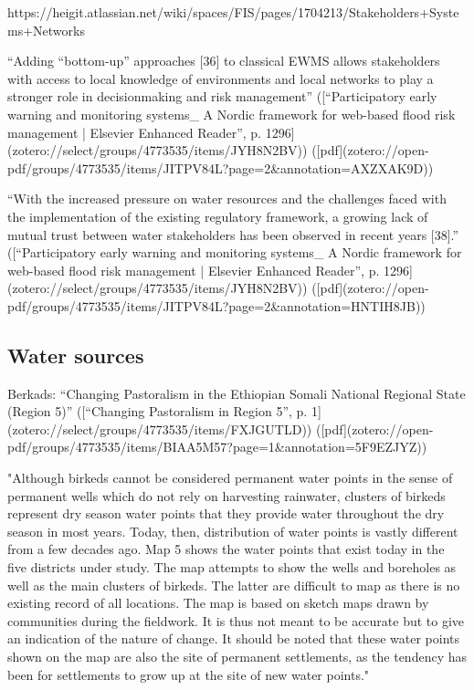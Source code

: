 {{https://heigit.atlassian.net/wiki/spaces/FIS/pages/1704213/Stakeholders+Systems+Networks

“Adding “bottom-up” approaches [36] to classical EWMS allows stakeholders with access to local knowledge of environments and local networks to play a stronger role in decisionmaking and risk management” ([“Participatory early warning and monitoring systems_ A Nordic framework for web-based flood risk management | Elsevier Enhanced Reader”, p. 1296](zotero://select/groups/4773535/items/JYH8N2BV)) ([pdf](zotero://open-pdf/groups/4773535/items/JITPV84L?page=2&annotation=AXZXAK9D))

“With the increased pressure on water resources and the challenges faced with the implementation of the existing regulatory framework, a growing lack of mutual trust between water stakeholders has been observed in recent years [38].” ([“Participatory early warning and monitoring systems_ A Nordic framework for web-based flood risk management | Elsevier Enhanced Reader”, p. 1296](zotero://select/groups/4773535/items/JYH8N2BV)) ([pdf](zotero://open-pdf/groups/4773535/items/JITPV84L?page=2&annotation=HNTIH8JB))

\subsection{Water sources}
Berkads:
“Changing Pastoralism in the Ethiopian Somali National Regional State (Region 5)” ([“Changing Pastoralism in Region 5”, p. 1](zotero://select/groups/4773535/items/FXJGUTLD)) ([pdf](zotero://open-pdf/groups/4773535/items/BIAA5M57?page=1&annotation=5F9EZJYZ))

"Although birkeds cannot be considered permanent water points in the sense of permanent wells which do not rely on harvesting rainwater, clusters of birkeds represent dry season water points that they provide water throughout the dry season in most years. Today, then, distribution of water points is vastly different from a few decades ago. Map 5 shows the water points that exist today in the five districts under study. The map attempts to show the wells and boreholes as well as the main clusters of birkeds. The latter are difficult to map as there is no existing record of all locations. The map is based on sketch maps drawn by communities during the fieldwork. It is thus not meant to be accurate but to give an indication of the nature of change. It should be noted that these water points shown on the map are also the site of permanent settlements, as the tendency has been for settlements to grow up at the site of new water points."

}}
